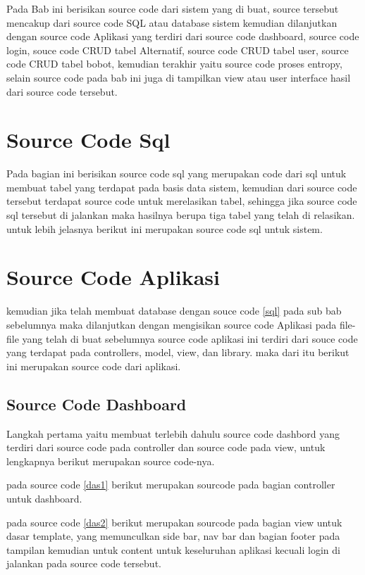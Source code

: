 Pada Bab ini berisikan source code dari sistem yang di buat, source tersebut mencakup dari source code SQL atau database sistem kemudian dilanjutkan dengan source code Aplikasi yang terdiri dari source code dashboard, source code login, souce code CRUD tabel Alternatif, source code CRUD tabel user, source code CRUD tabel bobot, kemudian terakhir yaitu source code proses entropy, selain source code pada bab ini juga di tampilkan view atau user interface hasil dari source code tersebut.
\pagebreak

\section{Source Code Sql}

Pada bagian ini berisikan source code sql yang merupakan code dari sql untuk membuat tabel yang terdapat pada basis data sistem, kemudian dari source code tersebut terdapat source code untuk merelasikan tabel, sehingga jika source code sql tersebut di jalankan maka hasilnya berupa tiga tabel yang telah di relasikan. untuk lebih jelasnya berikut ini merupakan source code sql untuk sistem.



\section{Source Code Aplikasi}
	kemudian jika telah membuat database dengan souce code \ref{sql} pada sub bab sebelumnya maka dilanjutkan dengan mengisikan source code Aplikasi pada file-file yang telah di buat sebelumnya source code aplikasi ini terdiri dari souce code yang terdapat pada controllers, model, view, dan library. maka dari itu berikut ini merupakan source code dari aplikasi.
\pagebreak

\subsection{Source Code Dashboard}

Langkah pertama yaitu membuat terlebih dahulu source code dashbord yang terdiri dari source code pada controller dan source code pada view, untuk lengkapnya berikut merupakan source code-nya.

pada source code \ref{das1} berikut merupakan sourcode pada bagian controller untuk dashboard.


pada source code \ref{das2} berikut merupakan sourcode pada bagian view untuk dasar template, yang memunculkan side bar, nav bar dan bagian footer pada tampilan kemudian untuk content untuk keseluruhan aplikasi kecuali login di jalankan pada source code tersebut.


